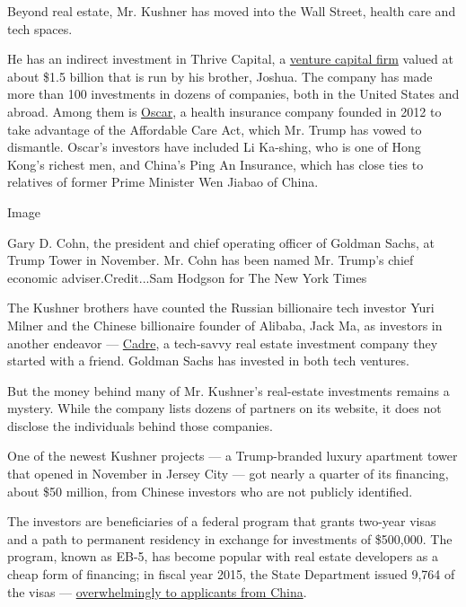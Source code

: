 Beyond real estate, Mr. Kushner has moved into the Wall Street, health
care and tech spaces.

He has an indirect investment in Thrive Capital, a
\href{https://www.nytimes.com/2016/07/19/business/dealbook/thrive-capital-raises-700-million-for-fifth-fund.html}{venture
capital firm} valued at about \$1.5 billion that is run by his brother,
Joshua. The company has made more than 100 investments in dozens of
companies, both in the United States and abroad. Among them is
\href{https://www.nytimes.com/2016/06/20/business/struggling-for-profit-selling-health-insurance-in-state-marketplaces.html}{Oscar},
a health insurance company founded in 2012 to take advantage of the
Affordable Care Act, which Mr. Trump has vowed to dismantle. Oscar's
investors have included Li Ka-shing, who is one of Hong Kong's richest
men, and China's Ping An Insurance, which has close ties to relatives of
former Prime Minister Wen Jiabao of China.

Image

Gary D. Cohn, the president and chief operating officer of Goldman
Sachs, at Trump Tower in November. Mr. Cohn has been named Mr. Trump's
chief economic adviser.Credit...Sam Hodgson for The New York Times

The Kushner brothers have counted the Russian billionaire tech investor
Yuri Milner and the Chinese billionaire founder of Alibaba, Jack Ma, as
investors in another endeavor --- \href{https://cadre.com/}{Cadre}, a
tech-savvy real estate investment company they started with a friend.
Goldman Sachs has invested in both tech ventures.

But the money behind many of Mr. Kushner's real-estate investments
remains a mystery. While the company lists dozens of partners on its
website, it does not disclose the individuals behind those companies.

One of the newest Kushner projects --- a Trump-branded luxury apartment
tower that opened in November in Jersey City --- got nearly a quarter of
its financing, about \$50 million, from Chinese investors who are not
publicly identified.

The investors are beneficiaries of a federal program that grants
two-year visas and a path to permanent residency in exchange for
investments of \$500,000. The program, known as EB-5, has become popular
with real estate developers as a cheap form of financing; in fiscal year
2015, the State Department issued 9,764 of the visas ---
\href{https://fas.org/sgp/crs/homesec/R44475.pdf}{overwhelmingly to
applicants from China}.

